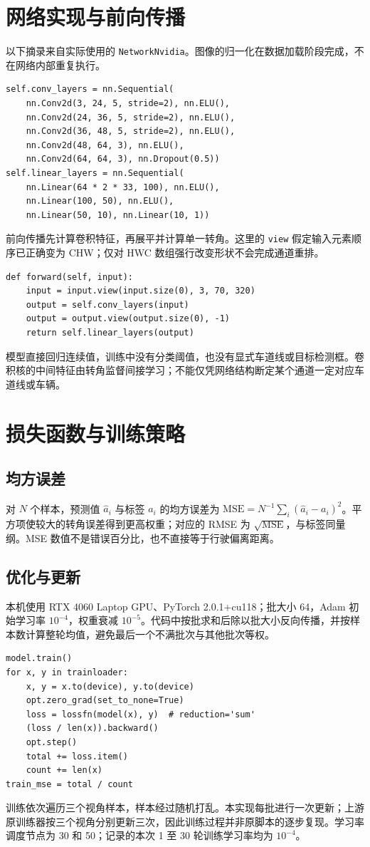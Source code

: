 \documentclass[UTF8,zihao=-4,fontset=windows]{ctexart}
\begin{document}
\section{网络实现与前向传播}
以下摘录来自实际使用的 \texttt{NetworkNvidia}。图像的归一化在数据加载阶段完成，不在网络内部重复执行。
\begin{lstlisting}
self.conv_layers = nn.Sequential(
    nn.Conv2d(3, 24, 5, stride=2), nn.ELU(),
    nn.Conv2d(24, 36, 5, stride=2), nn.ELU(),
    nn.Conv2d(36, 48, 5, stride=2), nn.ELU(),
    nn.Conv2d(48, 64, 3), nn.ELU(),
    nn.Conv2d(64, 64, 3), nn.Dropout(0.5))
self.linear_layers = nn.Sequential(
    nn.Linear(64 * 2 * 33, 100), nn.ELU(),
    nn.Linear(100, 50), nn.ELU(),
    nn.Linear(50, 10), nn.Linear(10, 1))
\end{lstlisting}
前向传播先计算卷积特征，再展平并计算单一转角。这里的 \texttt{view} 假定输入元素顺序已正确变为 CHW；仅对 HWC 数组强行改变形状不会完成通道重排。
\begin{lstlisting}
def forward(self, input):
    input = input.view(input.size(0), 3, 70, 320)
    output = self.conv_layers(input)
    output = output.view(output.size(0), -1)
    return self.linear_layers(output)
\end{lstlisting}
模型直接回归连续值，训练中没有分类阈值，也没有显式车道线或目标检测框。卷积核的中间特征由转角监督间接学习；不能仅凭网络结构断定某个通道一定对应车道线或车辆。
\newpage
\section{损失函数与训练策略}
\subsection{均方误差}
对 $N$ 个样本，预测值 $\hat{a}_i$ 与标签 $a_i$ 的均方误差为 $\mathrm{MSE}=N^{-1}\sum_i(\hat a_i-a_i)^2$。平方项使较大的转角误差得到更高权重；对应的 RMSE 为 $\sqrt{\mathrm{MSE}}$，与标签同量纲。MSE 数值不是错误百分比，也不直接等于行驶偏离距离。
\subsection{优化与更新}
本机使用 RTX 4060 Laptop GPU、PyTorch 2.0.1+cu118；批大小 64，Adam 初始学习率 $10^{-4}$，权重衰减 $10^{-5}$。代码中按批求和后除以批大小反向传播，并按样本数计算整轮均值，避免最后一个不满批次与其他批次等权。
\begin{lstlisting}
model.train()
for x, y in trainloader:
    x, y = x.to(device), y.to(device)
    opt.zero_grad(set_to_none=True)
    loss = lossfn(model(x), y)  # reduction='sum'
    (loss / len(x)).backward()
    opt.step()
    total += loss.item()
    count += len(x)
train_mse = total / count
\end{lstlisting}
训练依次遍历三个视角样本，样本经过随机打乱。本实现每批进行一次更新；上游原训练器按三个视角分别更新三次，因此训练过程并非原脚本的逐步复现。学习率调度节点为 30 和 50；记录的本次 1 至 30 轮训练学习率均为 $10^{-4}$。
\newpage
\end{document}
